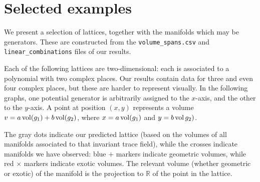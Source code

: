 \documentclass[10pt]{amsart}
\numberwithin{equation}{theorem}
\theoremstyle{definition}
\newcommand{\codebit}[1]{\texttt{#1}}
\begin{document}
\section{Selected examples}
\label{sec:lattice-examples}

We present a selection of lattices, together with the manifolds which may
be generators.  These are constructed from the \codebit{volume\_spans.csv}
and \codebit{linear\_combinations} files of our results.

Each of the following lattices are two-dimensional: each is associated
to a polynomial with two complex places. Our results contain data for
three and even four complex places, but these are harder to represent
visually. In the following graphs, one potential generator is arbitrarily
assigned to the $x$-axis, and the other to the $y$-axis.  A point at
position $(x,y)$ represents a volume $v = a \operatorname{vol}(g_1) + b \operatorname{vol}(g_2)$,
where $x = a \operatorname{vol}(g_1)$ and $y = b \operatorname{vol} g_2)$.

The gray dots indicate our predicted lattice (based on the volumes
of all manifolds associated to that invariant trace field), while the
crosses indicate manifolds we have observed: blue $+$ markers indicate
geometric volumes, while red $\times$ markers indicate exotic volumes.
The relevant volume (whether geometric or exotic) of the manifold is
the projection to $\mathbb{R}$ of the point in the lattice.
\end{document}
